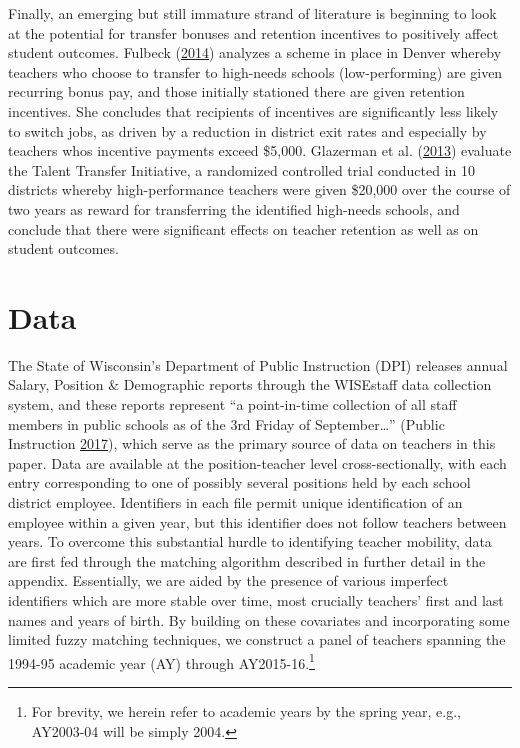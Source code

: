 \documentclass[12pt,]{article}
\let\rmarkdownfootnote\footnote%
\def\footnote{\protect\rmarkdownfootnote}
\begin{document}
Finally, an emerging but still immature strand of literature is
beginning to look at the potential for transfer bonuses and retention
incentives to positively affect student outcomes. Fulbeck
(\protect\hyperlink{ref-fulbeck}{2014}) analyzes a scheme in place in
Denver whereby teachers who choose to transfer to high-needs schools
(low-performing) are given recurring bonus pay, and those initially
stationed there are given retention incentives. She concludes that
recipients of incentives are significantly less likely to switch jobs,
as driven by a reduction in district exit rates and especially by
teachers whos incentive payments exceed \$5,000. Glazerman et al.
(\protect\hyperlink{ref-glazerman}{2013}) evaluate the Talent Transfer
Initiative, a randomized controlled trial conducted in 10 districts
whereby high-performance teachers were given \$20,000 over the course of
two years as reward for transferring the identified high-needs schools,
and conclude that there were significant effects on teacher retention as
well as on student outcomes.

\section{Data}\label{data}

The State of Wisconsin's Department of Public Instruction (DPI) releases
annual Salary, Position \& Demographic reports through the WISEstaff
data collection system, and these reports represent ``a point-in-time
collection of all staff members in public schools as of the 3rd Friday
of September\ldots{}'' (Public Instruction
\protect\hyperlink{ref-dpi}{2017}), which serve as the primary source of
data on teachers in this paper. Data are available at the
position-teacher level cross-sectionally, with each entry corresponding
to one of possibly several positions held by each school district
employee. Identifiers in each file permit unique identification of an
employee within a given year, but this identifier does not follow
teachers between years. To overcome this substantial hurdle to
identifying teacher mobility, data are first fed through the matching
algorithm described in further detail in the appendix. Essentially, we
are aided by the presence of various imperfect identifiers which are
more stable over time, most crucially teachers' first and last names and
years of birth. By building on these covariates and incorporating some
limited fuzzy matching techniques, we construct a panel of teachers
spanning the 1994-95 academic year (AY) through AY2015-16.\footnote{For
  brevity, we herein refer to academic years by the spring year, e.g.,
  AY2003-04 will be simply 2004.}
\end{document}
